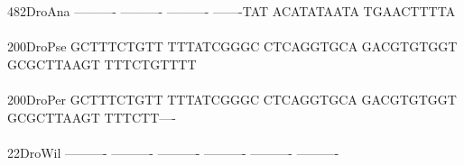 \documentclass[11pt,twoside,reqno,a4paper]{article}
\begin{document}
{482\hspace*{2\charwidth}DroAna	----------	----------	----------	-------TAT	ACATATAATA	TGAACTTTTA	\\
\hspace*{5\charwidth}\hspace*{7\charwidth}\hspace*{1\charwidth}\hspace*{1\charwidth}\hspace*{1\charwidth}\hspace*{1\charwidth}\hspace*{1\charwidth}\hspace*{1\charwidth}\\
200\hspace*{2\charwidth}DroPse	GCTTTCTGTT	TTTATCGGGC	CTCAGGTGCA	GACGTGTGGT	GCGCTTAAGT	TTTCTGTTTT	\\
\hspace*{5\charwidth}\hspace*{7\charwidth}\hspace*{1\charwidth}\hspace*{1\charwidth}\hspace*{1\charwidth}\hspace*{1\charwidth}\hspace*{1\charwidth}\hspace*{1\charwidth}\\
200\hspace*{2\charwidth}DroPer	GCTTTCTGTT	TTTATCGGGC	CTCAGGTGCA	GACGTGTGGT	GCGCTTAAGT	TTTCTT----	\\
\hspace*{5\charwidth}\hspace*{7\charwidth}\hspace*{1\charwidth}\hspace*{1\charwidth}\hspace*{1\charwidth}\hspace*{1\charwidth}\hspace*{1\charwidth}\hspace*{1\charwidth}\\
22\hspace*{3\charwidth}DroWil	----------	----------	----------	----------	----------	----------	\\
\hspace*{5\charwidth}\hspace*{7\charwidth}\hspace*{1\charwidth}\hspace*{1\charwidth}\hspace*{1\charwidth}\hspace*{1\charwidth}\hspace*{1\charwidth}\hspace*{1\charwidth}\\
}
\end{document}

